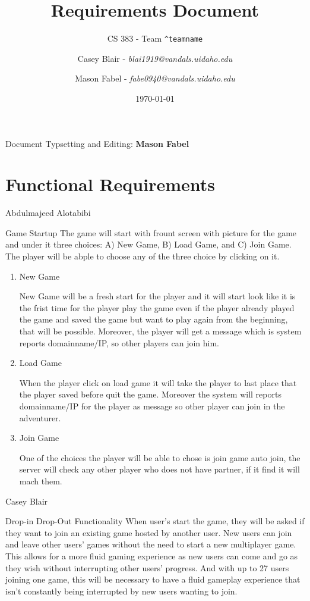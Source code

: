 \documentclass[12pt]{report}
\title{Requirements Document}
\subtitle{CS 383 - Team \texttt{\textasciicircum teamname}}
\author{
     Casey Blair - \textit{blai1919@vandals.uidaho.edu} \\
\and Mason Fabel - \textit{fabe0940@vandals.uidaho.edu} \\
}
\date{\today}
\begin{document}
\maketitle

\tableofcontents
Document Typsetting and Editing: \textbf{Mason Fabel}
\clearpage

\chapter{Functional Requirements}

\begin{section}{Abdulmajeed Alotabibi}
\begin{subsection}{Game Startup}
The game will start with frount screen with picture for the game and under
it three choices: A) New Game, B) Load Game, and C) Join Game. The player
will be abple to choose any of the three choice by clicking on it.

\begin{enumerate}
\item New Game

New Game will be a fresh start for the player and it will start look like
it is the frist time for the player play the game even if the player
already played the game and saved the game but want to play again from the
beginning, that will be possible. Moreover, the player will get a message
which is system reports domainname/IP, so other players can join him.

\item Load Game

When the player click on load game it will take the player to last place
that the player saved before quit the game. Moreover the system will
reports domainname/IP for the player as message so other player can join in
the adventurer.

\item Join Game

One of the choices the player will be able to chose is join game auto join,
the server will check any other player who does not have partner, if it
find it will mach them.
\end{enumerate}
\end{subsection}
\end{section}

\begin{section}{Casey Blair}
\begin{subsection}{Drop-in Drop-Out Functionality}
When user’s start the game, they will be asked if they want to join an
existing game hosted by another user. New users can join and leave other
users’ games without the need to start a new multiplayer game. This allows
for a more fluid gaming experience as new users can come and go as they
wish without interrupting other users’ progress. And with up to 27 users
joining one game, this will be necessary to have a fluid gameplay
experience that isn’t constantly being interrupted by new users wanting to
join.
\end{subsection}
\end{section}
\end{document}
